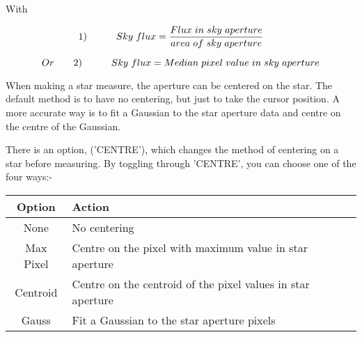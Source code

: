 {{   With
                                                                               

$$ {\hspace*{-2em}}     1) {\hspace*{3em}}   Sky{\hspace{0.3em}}flux  = \frac{Flux{\hspace{0.3em}}in{\hspace{0.3em}}sky{\hspace{0.3em}}aperture}{area{\hspace{0.3em}}of{\hspace{0.3em}}sky{\hspace{0.3em}}aperture} $$

$$   Or {\hspace*{2em}}   2) {\hspace*{3em}} Sky{\hspace{0.3em}}flux  = Median{\hspace{0.3em}}pixel{\hspace{0.3em}}value{\hspace{0.3em}}in{\hspace{0.3em}}sky{\hspace{0.3em}}aperture  $$
                                                                               
   When making a star measure, the aperture can be centered on the star.
   The default method is to have no centering, but just to take the
   cursor position. A more accurate way is to fit a Gaussian to the
   star aperture data and centre on the centre of the Gaussian.
                                                                               
   There is an option, ('CENTRE'), which changes the method of
   centering on a star before measuring. By toggling through 'CENTRE',
   you can choose one of the four ways:-
                               
\hspace*{4ex}\begin{tabular}{|c|l|}  \hline
    Option    &  Action \\ \hline
    None      &  No centering \\
    Max Pixel &  Centre on the pixel with maximum value in star aperture \\
    Centroid  &  Centre on the centroid of the pixel values in star aperture \\
    Gauss    &   Fit a Gaussian to the star aperture pixels \\ \hline
\end{tabular}
                                                                               
}}
